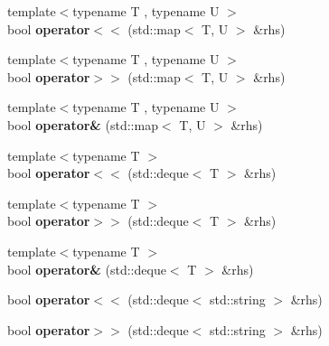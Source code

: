 \begin{DoxyCompactItemize}
\item 
\hypertarget{classBinaryStream_aaf43cee52c70268e098df62287114826}{{\footnotesize template$<$typename T , typename U $>$ }\\bool {\bfseries operator$<$$<$} (std\-::map$<$ T, U $>$ \&rhs)}\label{classBinaryStream_aaf43cee52c70268e098df62287114826}

\item 
\hypertarget{classBinaryStream_a1198ba811ea9b81e32bfd757253e3c5b}{{\footnotesize template$<$typename T , typename U $>$ }\\bool {\bfseries operator$>$$>$} (std\-::map$<$ T, U $>$ \&rhs)}\label{classBinaryStream_a1198ba811ea9b81e32bfd757253e3c5b}

\item 
\hypertarget{classBinaryStream_a67e220208d517aba27b88393abdd6f61}{{\footnotesize template$<$typename T , typename U $>$ }\\bool {\bfseries operator\&} (std\-::map$<$ T, U $>$ \&rhs)}\label{classBinaryStream_a67e220208d517aba27b88393abdd6f61}

\item 
\hypertarget{classBinaryStream_a477414ce94998ca75c85213c577f3a61}{{\footnotesize template$<$typename T $>$ }\\bool {\bfseries operator$<$$<$} (std\-::deque$<$ T $>$ \&rhs)}\label{classBinaryStream_a477414ce94998ca75c85213c577f3a61}

\item 
\hypertarget{classBinaryStream_aee6c9bf64e87b5409700b0528b00e7e6}{{\footnotesize template$<$typename T $>$ }\\bool {\bfseries operator$>$$>$} (std\-::deque$<$ T $>$ \&rhs)}\label{classBinaryStream_aee6c9bf64e87b5409700b0528b00e7e6}

\item 
\hypertarget{classBinaryStream_a22f187a7a8946216327ff1ab3b1cc1e5}{{\footnotesize template$<$typename T $>$ }\\bool {\bfseries operator\&} (std\-::deque$<$ T $>$ \&rhs)}\label{classBinaryStream_a22f187a7a8946216327ff1ab3b1cc1e5}

\item 
\hypertarget{classBinaryStream_abe970728b8a7ad30f95ac152f36e0885}{bool {\bfseries operator$<$$<$} (std\-::deque$<$ std\-::string $>$ \&rhs)}\label{classBinaryStream_abe970728b8a7ad30f95ac152f36e0885}

\item 
\hypertarget{classBinaryStream_a13827a06ad9d0321a30c8e4a460aefd1}{bool {\bfseries operator$>$$>$} (std\-::deque$<$ std\-::string $>$ \&rhs)}\label{classBinaryStream_a13827a06ad9d0321a30c8e4a460aefd1}


\end{DoxyCompactItemize}
